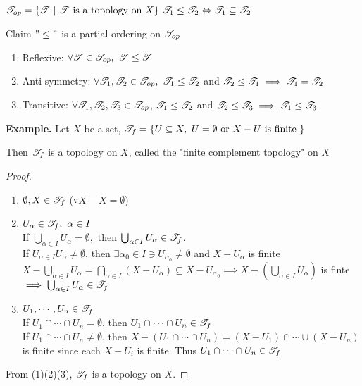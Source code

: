 \begin{defn}
	$\mathscr{T}_{op} = \{\mathscr{T} ~|~ \mathscr{T} \text{ is a topology on }X\}~ \mathscr{T}_1 \leq \mathscr{T}_2 \Leftrightarrow \mathscr{T}_1 \subseteq \mathscr{T}_2$
	
	Claim $"\leq"$ is a partial ordering on $\mathscr{T}_{op}$
	
	\begin{enumerate}[label = $\star$]
		\item Reflexive: $\forall \mathscr{T} \in \mathscr{T}_{op},~\mathscr{T} \leq \mathscr{T}$
		\item Anti-symmetry: $\forall \mathscr{T}_1 , \mathscr{T}_2 \in \mathscr{T}_{op},~\mathscr{T}_1 \leq \mathscr{T}_2$ and $\mathscr{T}_2 \leq \mathscr{T}_1 \implies \mathscr{T}_1 = \mathscr{T}_2$
		\item Transitive: $\forall \mathscr{T}_1,\mathscr{T}_2,\mathscr{T}_3 \in \mathscr{T}_{op}$, $\mathscr{T}_1 \leq \mathscr{T}_2$ and $\mathscr{T}_2 \leq \mathscr{T}_3 \implies \mathscr{T}_1 \leq \mathscr{T}_3$
	\end{enumerate}
\end{defn}

\textbf{Example.} Let $X$ be a set, $\mathscr{T}_f = \{U \subseteq X,~U = \emptyset \text{ or } X-U \text{ is finite }\}$

Then $\mathscr{T}_f$ is a topology on $X$, called the "finite complement topology" on $X$

\begin{proof}$ $
	\begin{enumerate}
		\item $\emptyset,X \in \mathscr{T}_f$ ($\because X - X = \emptyset$)
		\item $U_{\alpha} \in \mathscr{T}_f,~\alpha \in I$\\
		If $\bigcup_{\alpha \in I}U_{\alpha} = \emptyset,$ then $\bigcup_{\alpha \in I}U_{\alpha} \in \mathscr{T}_f$.\\
		If $U_{\alpha \in I}U_{\alpha} \neq \emptyset$, then $\exists \alpha_0 \in I \ni U_{\alpha_0} \neq \emptyset$ and $X-U_{\alpha}$ is finite\\
		$X - \bigcup_{\alpha \in I}U_{\alpha} = \bigcap_{\alpha \in I}(X - U_{\alpha}) \subseteq X - U_{\alpha_0} \implies X - (\bigcup_{\alpha \in I}U_{\alpha})$ is finte $\implies \bigcup_{\alpha \in I}U_{\alpha} \in \mathscr{T}_f$
		\item $U_1,\cdots,U_n \in \mathscr{T}_f$\\
		If $U_1 \cap \cdots \cap U_n = \emptyset$, then $U_1 \cap \cdots \cap U_n \in \mathscr{T}_f$\\
		If $U_1 \cap \cdots \cap U_n \neq \emptyset$, then $X - (U_1 \cap \cdots \cap U_n) = (X - U_1) \cap \cdots \cup (X - U_n)$ is finite since each $X - U_i$ is finite. Thus $U_1 \cap \cdots \cap U_n \in \mathscr{T}_f$
	\end{enumerate} 
	From (1)(2)(3), $\mathscr{T}_f$ is a topology on $X$.
\end{proof}

